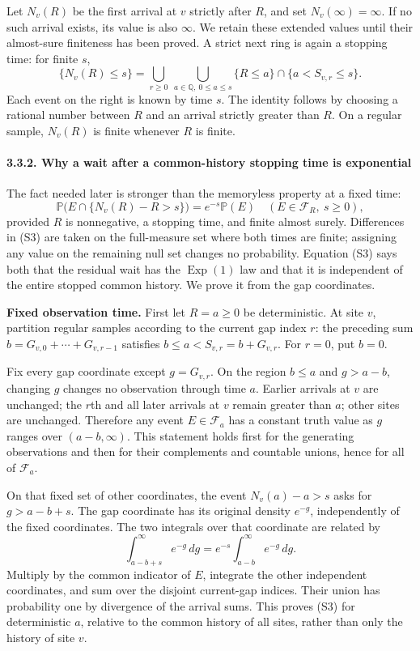 \documentclass[
  11pt,
  a4paper,
]{article}
\begin{document}
Let \(N_v(R)\) be the first arrival at \(v\) strictly after \(R\), and
set \(N_v(\infty)=\infty\). If no such arrival exists, its value is also
\(\infty\). We retain these extended values until their almost-sure
finiteness has been proved. A strict next ring is again a stopping time:
for finite \(s\), \[
\{N_v(R)\leq s\}
=\bigcup_{r\geq0}\ \bigcup_{a\in\mathbb Q,\ 0\leq a\leq s}
 \{R\leq a\}\cap\{a<S_{v,r}\leq s\}.
\tag{S2}
\] Each event on the right is known by time \(s\). The identity follows
by choosing a rational number between \(R\) and an arrival strictly
greater than \(R\). On a regular sample, \(N_v(R)\) is finite whenever
\(R\) is finite.

\paragraph{3.3.2. Why a wait after a common-history stopping time is
exponential}\label{why-a-wait-after-a-common-history-stopping-time-is-exponential}

The fact needed later is stronger than the memoryless property at a
fixed time: \[
\mathbb P\bigl(E\cap\{N_v(R)-R>s\}\bigr)=e^{-s}\mathbb P(E)
\quad(E\in\mathcal F_R,\ s\geq0),
\tag{S3}
\] provided \(R\) is nonnegative, a stopping time, and finite almost
surely. Differences in (S3) are taken on the full-measure set where both
times are finite; assigning any value on the remaining null set changes
no probability. Equation (S3) says both that the residual wait has the
\(\operatorname{Exp}(1)\) law and that it is independent of the entire
stopped common history. We prove it from the gap coordinates.

\textbf{Fixed observation time.} First let \(R=a\geq0\) be
deterministic. At site \(v\), partition regular samples according to the
current gap index \(r\): the preceding sum
\(b=G_{v,0}+\cdots+G_{v,r-1}\) satisfies \(b\leq a<S_{v,r}=b+G_{v,r}\).
For \(r=0\), put \(b=0\).

Fix every gap coordinate except \(g=G_{v,r}\). On the region \(b\leq a\)
and \(g>a-b\), changing \(g\) changes no observation through time \(a\).
Earlier arrivals at \(v\) are unchanged; the \(r\)th and all later
arrivals at \(v\) remain greater than \(a\); other sites are unchanged.
Therefore any event \(E\in\mathcal F_a\) has a constant truth value as
\(g\) ranges over \((a-b,\infty)\). This statement holds first for the
generating observations and then for their complements and countable
unions, hence for all of \(\mathcal F_a\).

On that fixed set of other coordinates, the event \(N_v(a)-a>s\) asks
for \(g>a-b+s\). The gap coordinate has its original density \(e^{-g}\),
independently of the fixed coordinates. The two integrals over that
coordinate are related by \[
\int_{a-b+s}^{\infty}e^{-g}\,dg
=e^{-s}\int_{a-b}^{\infty}e^{-g}\,dg.
\] Multiply by the common indicator of \(E\), integrate the other
independent coordinates, and sum over the disjoint current-gap indices.
Their union has probability one by divergence of the arrival sums. This
proves (S3) for deterministic \(a\), relative to the common history of
all sites, rather than only the history of site \(v\).
\end{document}
